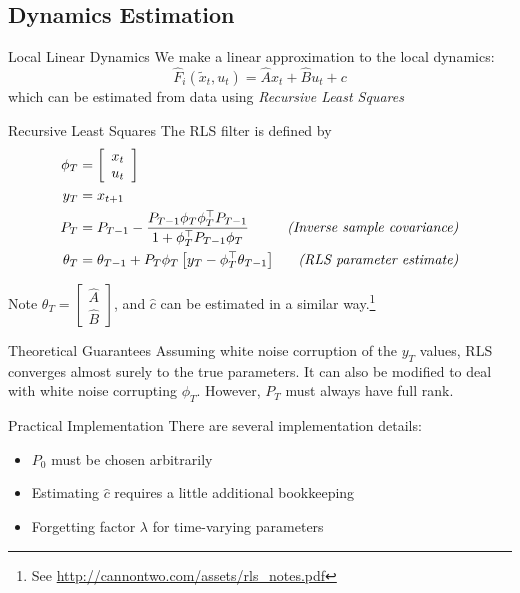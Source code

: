\documentclass{beamer}
\begin{document}
\subsection{Dynamics Estimation}

\begin{frame}{Local Linear Dynamics}
  We make a linear approximation to the local dynamics:
  \begin{equation}
    \hat{F}_{i}(\tilde{x}_t, u_t) = \hat{A}x_t + \hat{B}u_t + c 
  \end{equation}
  which can be estimated from data using \emph{Recursive Least Squares}
\end{frame}

\begin{frame}{Recursive Least Squares}
  The RLS filter is defined by
  \begin{align*}
    \phi_T &= \left[\begin{array}{l}x_t \\ u_t \end{array}\right] \\
    y_T &= x_{t+1}\\
    P_T &= P_{T-1} - \frac{P_{T-1}\phi_T \phi_T^\top P_{T-1}}{1 + \phi_T^\top P_{T-1} \phi_T} &\text{\emph{(Inverse sample covariance)}} \\
    \theta_T &= \theta_{T-1} + P_T \phi_T \left[y_T - \phi_T^\top \theta_{T-1} \right] &\text{\emph{(RLS parameter estimate)}}
  \end{align*}

  Note $\theta_T = \begin{bmatrix}\hat{A} \\ \hat{B}\end{bmatrix}$, and $\hat{c}$ can be estimated in a similar way.\footnote{See \url{http://cannontwo.com/assets/rls_notes.pdf}}
\end{frame}

\begin{frame}{Theoretical Guarantees}
  Assuming white noise corruption of the $y_T$ values, RLS converges almost
  surely to the true parameters. It can also be modified to deal with white
  noise corrupting $\phi_T$. However, $P_T$ must always have full rank.
\end{frame}

\begin{frame}{Practical Implementation}
  There are several implementation details:
  \begin{itemize}
    \item $P_0$ must be chosen arbitrarily
    \item Estimating $\hat{c}$ requires a little additional bookkeeping
    \item Forgetting factor $\lambda$ for time-varying parameters
  \end{itemize}
\end{frame}
\end{document}
